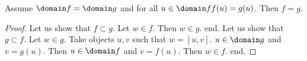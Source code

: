 \documentclass[a4paper,draft]{amsproc}
\begin{document}
\begin{forthel}
\begin{theorem}
Assume $\domain f = \domain g$ and for all $u \in \domain f f(u) = g(u)$. Then $f = g$.
\end{theorem}
\begin{proof}
Let us show that $f \subset g$.
Let $w \in f$. 
Then $w \in g$. end.
Let us show that $g \subset f$.
Let $w \in g$.  
Take objects $u, v$ such that $w=[u,v]$.
$u \in \domain g$ and $v = g(u)$.
Then $u \in \domain f$ and $v = f(u)$.
Then $w \in f$. end.
\end{proof}


\end{forthel}
\end{document}
